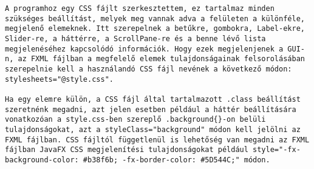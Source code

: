 \begin{verbatim}
A programhoz egy CSS fájlt szerkesztettem, ez tartalmaz minden szükséges beállítást, melyek meg vannak adva a felületen a különféle, megjelenő elemeknek. Itt szerepelnek a betűkre, gombokra, Label-ekre, Slider-re, a háttérre, a ScrollPane-re és a benne lévő lista megjelenéséhez kapcsolódó információk. Hogy ezek megjelenjenek a GUI-n, az FXML fájlban a megfelelő elemek tulajdonságainak felsorolásában szerepelnie kell a használandó CSS fájl nevének a következő módon: stylesheets="@style.css". 

Ha egy elemre külön, a CSS fájl által tartalmazott .class beállítást szeretnénk megadni, azt jelen esetben például a háttér beállítására vonatkozóan a style.css-ben szereplő .background{}-on belüli tulajdonságokat, azt a styleClass="background" módon kell jelölni az FXML fájlban. CSS fájltól függetlenül is lehetőség van megadni az FXML fájlban JavaFX CSS megjelenítési tulajdonságokat például style="-fx-background-color: #b38f6b; -fx-border-color: #5D544C;" módon. 
\end{verbatim}